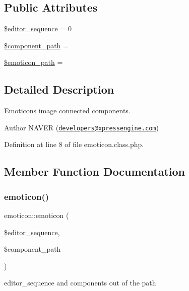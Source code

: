 \subsection*{Public Attributes}
\begin{DoxyCompactItemize}
\item 
\hyperlink{classemoticon_ac9b927beccb93f77b8ef28b363841f38}{\$editor\+\_\+sequence} = 0
\item 
\hyperlink{classemoticon_a6553902e718eb62d7f0e1bab0406c653}{\$component\+\_\+path} = \textquotesingle{}\textquotesingle{}
\item 
\hyperlink{classemoticon_a21bb58c0d640141cc27203b584f99dd8}{\$emoticon\+\_\+path} = \textquotesingle{}\textquotesingle{}
\end{DoxyCompactItemize}


\subsection{Detailed Description}
Emoticons image connected components. 

\begin{DoxyAuthor}{Author}
N\+A\+V\+ER (\href{mailto:developers@xpressengine.com}{\tt developers@xpressengine.\+com}) 
\end{DoxyAuthor}


Definition at line 8 of file emoticon.\+class.\+php.



\subsection{Member Function Documentation}
\mbox{\label{classemoticon_a8b042772a4d61cfcbdecbe945102a997}} 
\subsubsection{\texorpdfstring{emoticon()}{emoticon()}}
{\footnotesize\ttfamily emoticon\+::emoticon (\begin{DoxyParamCaption}\item[{}]{\$editor\+\_\+sequence,  }\item[{}]{\$component\+\_\+path }\end{DoxyParamCaption})}



editor\+\_\+sequence and components out of the path 



